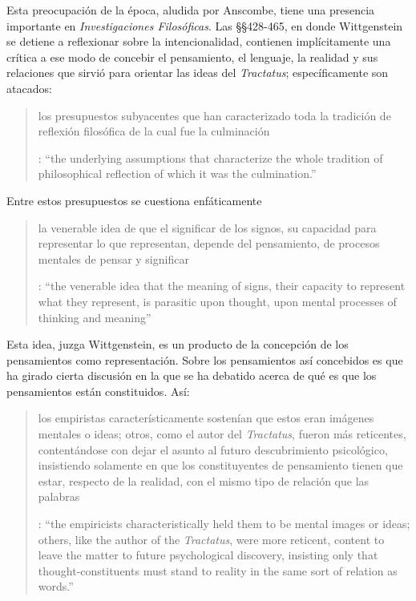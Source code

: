 Esta preocupación de la época, aludida por Anscombe, tiene una presencia importante en \emph{Investigaciones Filosóficas}. Las \S\S428-465, en donde Wittgenstein se detiene a reflexionar sobre la intencionalidad, contienen implícitamente una crítica a ese modo de concebir el pensamiento, el lenguaje, la realidad y sus relaciones que sirvió para orientar las ideas del \emph{Tractatus}; específicamente son atacados: \blockquote[{\cite[3]{hacker2000mind}}: \enquote{the underlying assumptions that characterize the whole tradition of philosophical reflection of which it was the culmination.}]{los presupuestos subyacentes que han caracterizado toda la tradición de reflexión filosófica de la cual  fue la culminación}. Entre estos presupuestos se cuestiona enfáticamente \blockquote[{\cite[3]{hacker2000mind}}: \enquote{the venerable idea that the meaning of signs, their capacity to represent what they represent, is parasitic upon thought, upon mental processes of thinking and meaning}]{la venerable idea de que el significar de los signos, su capacidad para representar lo que representan, depende del pensamiento, de procesos mentales de pensar y significar}. Esta idea, juzga Wittgenstein, es un producto de la concepción de los pensamientos como representación. Sobre los pensamientos así concebidos es que ha girado cierta discusión en la que se ha debatido acerca de qué es que los pensamientos están constituidos. Así: \blockquote[{\cite[3]{hacker2000mind}}: \enquote{the empiricists characteristically held them to be mental images or ideas; others, like the author of the \emph{Tractatus}, were more reticent, content to leave the matter to future psychological discovery, insisting only that thought-constituents must stand to reality in the same sort of relation as words.}]{los empiristas característicamente sostenían que estos eran imágenes mentales o ideas; otros, como el autor del \emph{Tractatus}, fueron más reticentes, contentándose con dejar el asunto al futuro descubrimiento psicológico, insistiendo solamente en que los constituyentes de pensamiento tienen que estar, respecto de la realidad, con el mismo tipo de relación que las palabras}.

